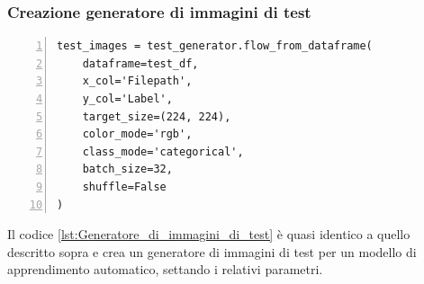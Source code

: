 \documentclass[a4paper,final,12pt]{report}
\begin{document}
\newpage
\subsubsection{Creazione generatore di immagini di test}
\begin{lstlisting}[caption={Creazione del generatore di immagini di test.}, label={lst:Generatore_di_immagini_di_test}, breaklines, escapechar=`\%, frame=lines, basicstyle=\small\ttfamily, keepspaces=true, numbers=left]
test_images = test_generator.flow_from_dataframe(
    dataframe=test_df,
    x_col='Filepath',
    y_col='Label',
    target_size=(224, 224),
    color_mode='rgb',
    class_mode='categorical',
    batch_size=32,
    shuffle=False
)
\end{lstlisting}
Il codice \ref{lst:Generatore_di_immagini_di_test} è quasi identico a quello descritto sopra e crea un generatore di immagini di test per un modello di apprendimento automatico, settando i relativi parametri. 
\end{document}
